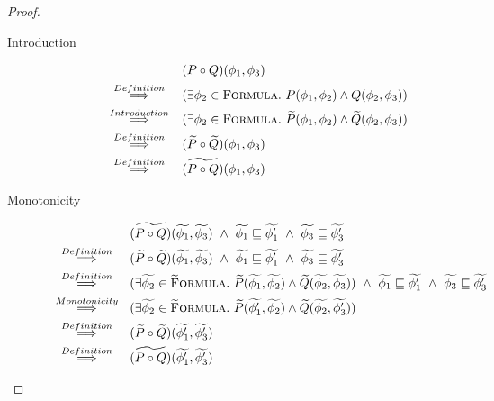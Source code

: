 \begin{proof}
    \begin{description}
        \item[Introduction] 
        \begin{align*}
        &(P \circ Q)(\phi_1, \phi_3)\\
        \overset{Definition}{~\quad\quad\implies\quad\quad~}
        &(\exists \phi_2 \in \textup{\textsc{Formula}}.~ P(\phi_1, \phi_2) \wedge Q(\phi_2, \phi_3))\\
        \overset{Introduction}{~\quad\quad\implies\quad\quad~}
        &(\exists \phi_2 \in \textup{\textsc{Formula}}.~ \widetilde{P}(\phi_1, \phi_2) \wedge \widetilde{Q}(\phi_2, \phi_3))\\
        \overset{Definition}{~\quad\quad\implies\quad\quad~}
        &(\widetilde{P} \circ \widetilde{Q})(\phi_1, \phi_3)\\
        \overset{Definition}{~\quad\quad\implies\quad\quad~}
        &\widetilde{(P \circ Q)}(\phi_1, \phi_3)\\
        \end{align*}
        
        \item[Monotonicity] 
        \begin{align*}
        &\widetilde{(P \circ Q)}(\widetilde{\phi_1}, \widetilde{\phi_3}) ~\wedge~ \widetilde{\phi_1} \sqsubseteq \widetilde{\phi_1'} ~\wedge~ \widetilde{\phi_3} \sqsubseteq \widetilde{\phi_3'}\\
        \overset{Definition}{~\quad\quad\implies\quad\quad~}
        &(\widetilde{P} \circ \widetilde{Q})(\widetilde{\phi_1}, \widetilde{\phi_3}) ~\wedge~ \widetilde{\phi_1} \sqsubseteq \widetilde{\phi_1'} ~\wedge~ \widetilde{\phi_3} \sqsubseteq \widetilde{\phi_3'}\\
        \overset{Definition}{~\quad\quad\implies\quad\quad~}
        &(\exists \widetilde{\phi_2} \in \textup{\textsc{\ensuremath{\widetilde{\text{F}}}ormula}}.~ \widetilde{P}(\widetilde{\phi_1}, \widetilde{\phi_2}) \wedge \widetilde{Q}(\widetilde{\phi_2}, \widetilde{\phi_3})) ~\wedge~ \widetilde{\phi_1} \sqsubseteq \widetilde{\phi_1'} ~\wedge~ \widetilde{\phi_3} \sqsubseteq \widetilde{\phi_3'}\\
        \overset{Monotonicity}{~\quad\quad\implies\quad\quad~}
        &(\exists \widetilde{\phi_2} \in \textup{\textsc{\ensuremath{\widetilde{\text{F}}}ormula}}.~ \widetilde{P}(\widetilde{\phi_1'}, \widetilde{\phi_2}) \wedge \widetilde{Q}(\widetilde{\phi_2}, \widetilde{\phi_3'}))\\
        \overset{Definition}{~\quad\quad\implies\quad\quad~}
        &(\widetilde{P} \circ \widetilde{Q})(\widetilde{\phi_1'}, \widetilde{\phi_3'})\\
        \overset{Definition}{~\quad\quad\implies\quad\quad~}
        &\widetilde{(P \circ Q)}(\widetilde{\phi_1'}, \widetilde{\phi_3'})\\
        \end{align*}
    \end{description}
\end{proof}

